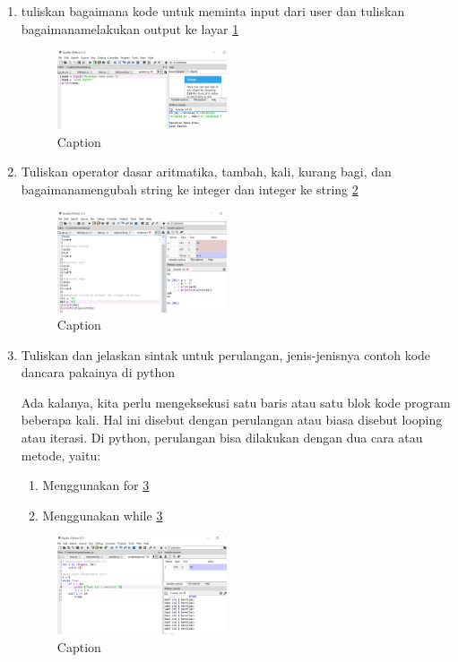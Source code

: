 \begin{enumerate}
        \item  tuliskan bagaimana kode untuk meminta input dari user dan tuliskan bagaimanamelakukan output ke layar \ref{capture22}
        \begin{figure} [htbp!]
            \centering
            \includegraphics[width=5cm]{figures/Capture22.PNG}
            \caption{Caption}
            \label{capture22}
        \end{figure}
        
        \item Tuliskan operator dasar aritmatika, tambah, kali, kurang bagi, dan bagaimanamengubah string ke integer dan integer ke string \ref{capture23}
        \begin{figure} [htbp!]
            \centering
            \includegraphics[width=5cm]{figures/Capture23.PNG}
            \caption{Caption}
            \label{capture23}
        \end{figure}
        
        \item Tuliskan dan jelaskan sintak untuk perulangan, jenis-jenisnya contoh kode dancara pakainya di python
        \par
        Ada kalanya, kita perlu mengeksekusi satu baris atau satu blok kode program beberapa kali. Hal ini disebut dengan perulangan atau biasa disebut looping atau iterasi.
        Di python, perulangan bisa dilakukan dengan dua cara atau metode, yaitu:
        \begin{enumerate}
            \item Menggunakan for \ref{capture24}
            \item Menggunakan while \ref{capture24}
        \end{enumerate}
        \begin{figure} [htbp!]
            \centering
            \includegraphics[width=5cm]{figures/Capture24.PNG}
            \caption{Caption}
            \label{capture24}
        \end{figure}
        

\end{enumerate}
